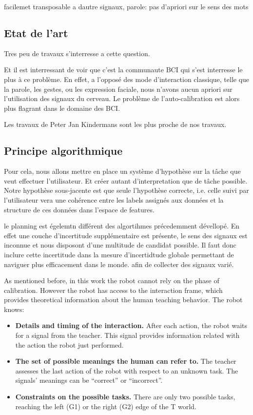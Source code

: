 facilemet transposable a dautre signaux, parole: pas d'apriori sur le sens des mots

\subsection*{Etat de l'art}

Tres peu de travaux s'interresse a cette question.

Et il est interressant de voir que c'est la communaute BCI qui s'est interresse le plus à ce problème. En effet, a l'opposé des mode d'interaction classique, telle que la parole, les gestes, ou les expression faciale, nous n'avons aucun apriori sur l'utilisation des signaux du cerveau. Le problème de l'auto-calibration est alors plus flagrant dans le domaine des BCI.

Les travaux de Peter Jan Kindermans sont les plus proche de nos travaux.

\subsection*{Principe algorithmique}

Pour cela, nous allons mettre en place un système d'hypothèse sur la tâche que veut effectuer l'utilisateur. Et créer autant d'interpretation que de tâche possible. Notre hypothèse sous-jacente est que seule l'hypothèse correcte, i.e. celle suivi par l'utilisateur vera une cohérence entre les labels assignés aux données et la structure de ces données dans l'espace de features.

le planning est égelemtn différent des algortihmes précedemment dévellopé. En effet une couche d'incertitude supplémentaire est présente, le sens des signaux est inconnue et nous disposont d'une multitude de candidat possible. Il faut donc inclure cette incertitude dans la mesure d'incertidtude globale permettant de naviguer plus efficacement dans le monde. afin de collecter des signaux varié.

As mentioned before, in this work the robot cannot rely on the phase of calibration. However the robot has access to the interaction frame, which provides theoretical information about the human teaching behavior. The robot knows:
\begin{itemize}

\item \textbf{Details and timing of the interaction.} After each action, the robot waits for a signal from the teacher. This signal provides information related with the action the robot just performed.

\item \textbf{The set of possible meanings the human can refer to.} The teacher assesses the last action of the robot with respect to an unknown task. The signals' meanings can be ``correct'' or ``incorrect''.

\item \textbf{Constraints on the possible tasks.} There are only two possible tasks, reaching the left (G1) or the right (G2) edge of the T world.

\end{itemize}

